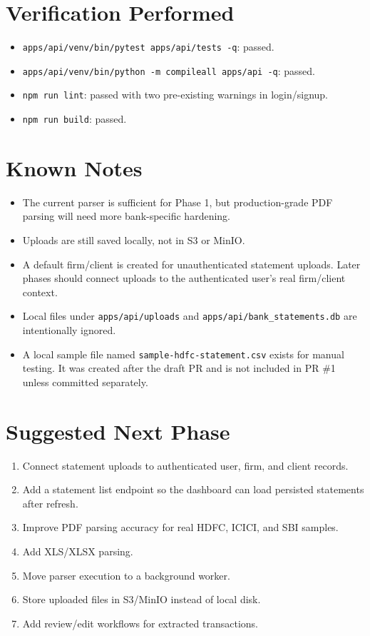 \documentclass[11pt,a4paper]{article}
\begin{document}
\section{Verification Performed}

\begin{itemize}[leftmargin=*]
  \item \texttt{apps/api/venv/bin/pytest apps/api/tests -q}: passed.
  \item \texttt{apps/api/venv/bin/python -m compileall apps/api -q}: passed.
  \item \texttt{npm run lint}: passed with two pre-existing warnings in login/signup.
  \item \texttt{npm run build}: passed.
\end{itemize}

\section{Known Notes}

\begin{itemize}[leftmargin=*]
  \item The current parser is sufficient for Phase 1, but production-grade PDF parsing will need more bank-specific hardening.
  \item Uploads are still saved locally, not in S3 or MinIO.
  \item A default firm/client is created for unauthenticated statement uploads. Later phases should connect uploads to the authenticated user's real firm/client context.
  \item Local files under \texttt{apps/api/uploads} and \texttt{apps/api/bank\_statements.db} are intentionally ignored.
  \item A local sample file named \texttt{sample-hdfc-statement.csv} exists for manual testing. It was created after the draft PR and is not included in PR \#1 unless committed separately.
\end{itemize}

\section{Suggested Next Phase}

\begin{enumerate}[leftmargin=*]
  \item Connect statement uploads to authenticated user, firm, and client records.
  \item Add a statement list endpoint so the dashboard can load persisted statements after refresh.
  \item Improve PDF parsing accuracy for real HDFC, ICICI, and SBI samples.
  \item Add XLS/XLSX parsing.
  \item Move parser execution to a background worker.
  \item Store uploaded files in S3/MinIO instead of local disk.
  \item Add review/edit workflows for extracted transactions.
\end{enumerate}
\end{document}
